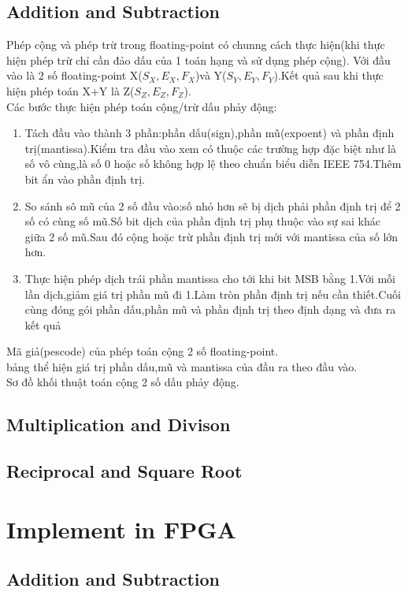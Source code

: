 \documentclass[11pt,a4paper,vietnamese]{report}
\begin{document}
\section{Addition and Subtraction}
Phép cộng và phép trừ trong floating-point có chunng cách thực hiện(khi thực hiện phép trừ chỉ cần đảo dấu của 1 toán hạng và sử dụng phép cộng).
Với đầu vào là 2 số floating-point X($S_X,E_X,F_X$)và Y($S_Y,E_Y,F_Y$).Kết quả sau khi thực hiện phép toán X+Y là Z($S_Z,E_Z,F_Z$).\\
Các bước thực hiện phép toán cộng/trừ dấu phảy động:
\begin{enumerate}
\item Tách đầu vào thành 3 phần:phần dấu(sign),phần mũ(expoent) và phần định trị(mantissa).Kiểm tra đầu vào xem có thuộc các trường hợp đặc biệt như là số vô cùng,là số 0 hoặc số không hợp lệ theo chuẩn biểu diễn IEEE 754.Thêm bit ẩn vào phần định trị.
\item So sánh sô mũ của 2 số đầu vào:số nhỏ hơn sẽ bị dịch phải phần định trị để 2 số có cùng số mũ.Số bit dịch của phần định trị phụ thuộc vào sự sai khác giữa 2 số mũ.Sau đó cộng hoặc trừ phần định trị mới với mantissa của số lớn hơn.
\item Thực hiện phép dịch trái phần mantissa cho tới khi bit MSB bằng 1.Với mỗi lần dịch,giảm giá trị phần mũ đi 1.Làm tròn phần định trị nếu cần thiết.Cuối cùng đóng gói phần dấu,phần mũ và phần định trị theo định dạng và đưa ra kết quả
\end{enumerate}
Mã giả(pescode) của phép toán cộng 2 số floating-point.\\
bảng thể hiện giá trị phần dấu,mũ và mantissa của đầu ra theo đầu vào.\\
Sơ đồ khối thuật toán cộng 2 số dấu phảy động.
\section{Multiplication and Divison}

\section{Reciprocal and Square Root}

\chapter{Implement in FPGA}
\section{Addition and Subtraction}
\end{document}
